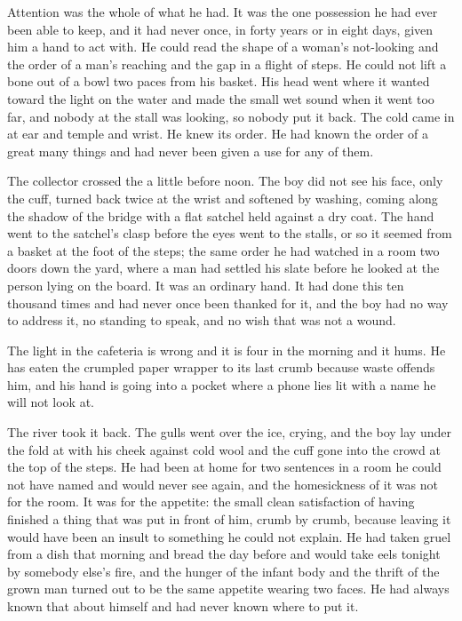 Attention was the whole of what he had. It was the one possession he had ever been able to keep, and it had never once, in forty years or in eight days, given him a hand to act with. He could read the shape of a woman's not-looking and the order of a man's reaching and the gap in a flight of steps. He could not lift a bone out of a bowl two paces from his basket. His head went where it wanted toward the light on the water and made the small wet sound when it went too far, and nobody at the stall was looking, so nobody put it back. The cold came in at ear and temple and wrist. He knew its order. He had known the order of a great many things and had never been given a use for any of them.

\scenebreak

The collector crossed the  a little before noon. The boy did not see his face, only the cuff, turned back twice at the wrist and softened by washing, coming along the shadow of the bridge with a flat satchel held against a dry coat. The hand went to the satchel's clasp before the eyes went to the stalls, or so it seemed from a basket at the foot of the steps; the same order he had watched in a room two doors down the yard, where a man had settled his slate before he looked at the person lying on the board. It was an ordinary hand. It had done this ten thousand times and had never once been thanked for it, and the boy had no way to address it, no standing to speak, and no wish that was not a wound.

The light in the cafeteria is wrong and it is four in the morning and it hums. He has eaten the crumpled paper wrapper to its last crumb because waste offends him, and his hand is going into a pocket where a phone lies lit with a name he will not look at.

The river took it back. The gulls went over the ice, crying, and the boy lay under the fold at  with his cheek against cold wool and the cuff gone into the crowd at the top of the steps. He had been at home for two sentences in a room he could not have named and would never see again, and the homesickness of it was not for the room. It was for the appetite: the small clean satisfaction of having finished a thing that was put in front of him, crumb by crumb, because leaving it would have been an insult to something he could not explain. He had taken gruel from a dish that morning and bread the day before and would take eels tonight by somebody else's fire, and the hunger of the infant body and the thrift of the grown man turned out to be the same appetite wearing two faces. He had always known that about himself and had never known where to put it.

